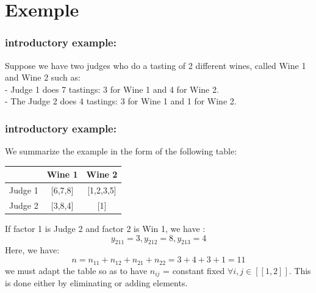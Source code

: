 \documentclass[unknownkeysallowed]{beamer}
\begin{document}
\section{Exemple}


\begin{frame}
\frametitle{introductory example:}
Suppose we have two judges who do a tasting of 2 different wines, called Wine 1 and Wine 2 such as:\\
- Judge 1 does 7 tastings: 3 for Wine 1 and 4 for Wine 2.\\
- The Judge 2 does 4 tastings: 3 for Wine 1 and 1 for Wine 2.
\end{frame}

\begin{frame}
\frametitle{introductory example:}
We summarize the example in the form of the following table:\\

\begin{center}
\begin{tabular}{ |c|c|c|  }
\hline
 & Wine 1 & Wine 2  \\
\hline
Judge 1 & [6,7,8] & [1,2,3,5]  \\
\hline
Judge 2 & [3,8,4] & [1]  \\

\hline
\end{tabular}
\end{center}









If factor 1 is Judge 2 and factor 2 is Win 1, we have :$$y_{211}=3, y_{212}=8, y_{213}=4 $$
Here, we have: \\$$n= n_{1 1}+n_{1 2}+n_{2 1}+n_{2 2}=3+4+3+1=11$$
we must adapt the table so as to have $n_{ij}$ = constant fixed $\forall i,j\in[\![1, 2]\!]$.
 This is done either by eliminating or adding elements.

\end{frame}

\end{document}
